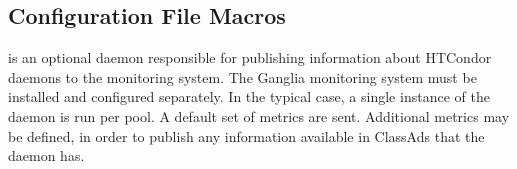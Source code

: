 \subsection{\label{sec:Config-gangliad} Configuration File Macros}

 is an optional daemon responsible
for publishing information about HTCondor daemons to the 
monitoring system. 
The {Ganglia} monitoring system  must be installed and configured separately.
In the typical case, a single instance of the  daemon
is run per pool.
A default set of metrics are sent.
Additional metrics may be defined, 
in order to publish any information available 
in ClassAds that the  daemon has.

